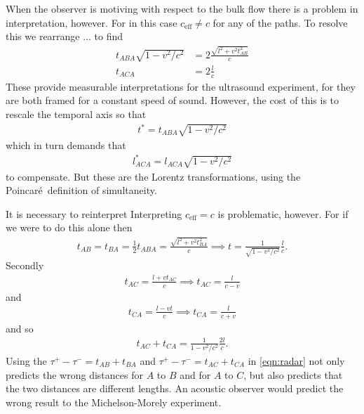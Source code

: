 \documentclass[10pt, fleqn,draft,showtrims,oldfontcommands]{article} %
\newcommand{\eqnref}[1]{\ref{eqn:#1}}
\newcommand{\tm}{\tau^-}
\newcommand{\tp}{\tau^+}
\newcommand{\half}{\tfrac{1}{2}}
\newcommand{\Poincare}{Poincar{\'e}}
\newcommand{\eff}{{\textrm{eff}}}
\begin{document}
When the observer is motiving with respect to the bulk flow there is a problem in interpretation, however.
For in this case $c_\eff\ne c$ for any of the paths. %
To resolve this we rearrange ... to find 
\begin{align}
  t_{ABA}    \sqrt{1-v^2/c^2} &=2 \frac{\sqrt{l^2+v^2t_{AB}^2}}{c} \\
  t_{ACA} &= 2\frac{l}{c}
\end{align}
These provide measurable  interpretations for the ultrasound experiment, for they are both framed for a constant speed of sound.
However, the cost of this is to rescale the temporal axis so that 
\begin{align}
t^\ast = t_{ABA}    \sqrt{1-v^2/c^2}
\end{align}
which in turn demands that 
\begin{align}
l^\ast_{ACA} = l_{ACA}    \sqrt{1-v^2/c^2}
\end{align}
to compensate.
But these are the Lorentz transformations, using the \Poincare\ definition of simultaneity.

%


It is necessary to reinterpret 
Interpreting  $c_\eff = c$ is problematic, however.
For if we were to do this alone then 
\begin{align}
  t_{AB} = t_{BA} =  \half t_{ABA} = \frac{\sqrt{l^2+v^2t_{BA}^2}}{c} \implies t = \frac{1}{\sqrt{1-v^2/c^2}} \frac{l}{c}.
\end{align}
Secondly
\begin{align}
 t_{AC} =  \frac{l+vt_{AC}}{c}\implies t_{AC} = \frac{l}{c-v}
\end{align}
and 
\begin{align}
 t_{CA} =  \frac{l-vt}{c} \implies t_{CA} = \frac{l}{c+v}
\end{align}
and so 
\begin{align}
t_{AC}+t_{CA} = \frac{1}{{1-v^2/c^2}} \frac{2l}{c}.
\end{align}
Using the $\tp-\tm= t_{AB}+t_{BA}$ and $\tp-\tm= t_{AC}+t_{CA}$ in \eqnref{radar} not only predicts the wrong distances for $A$ to $B$ and for $A$ to $C$,
but also predicts that the two distances are different lengths.
An acoustic observer  would predict the wrong result to the  Michelson-Morely experiment.
\end{document}
